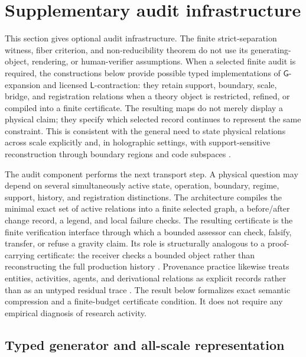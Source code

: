 \documentclass[11pt]{article}
\newcommand{\GOp}{\ensuremath{\mathsf{G}}}
\newcommand{\LOp}{\ensuremath{\mathsf{L}}}
\theoremstyle{definition}
\begin{document}
\section{Supplementary audit infrastructure}
\label{supp:architecture}

This section gives optional audit infrastructure. The finite strict-separation
witness, fiber criterion, and non-reducibility theorem do not use its
generating-object, rendering, or human-verifier assumptions. When a selected
finite audit is required, the constructions below provide possible typed
implementations of $\GOp$-expansion and licensed $\LOp$-contraction: they retain
support, boundary, scale, bridge, and registration relations when a theory object
is restricted, refined, or compiled into a finite certificate. The resulting maps do not merely display a physical claim; they
specify which selected record continues to represent the same constraint. This is
consistent with the general need to state physical relations across scale explicitly
\cite{S_Wilson1971} and, in holographic settings, with support-sensitive
reconstruction through boundary regions and code subspaces
\cite{S_AlmheiriDongHarlow2015,S_DongHarlowWall2016}.

The audit component performs the next transport step. A physical question may
depend on several simultaneously active state, operation, boundary, regime,
support, history, and registration distinctions. The architecture compiles the
minimal exact set of active relations into a finite selected graph, a before/after
change record, a legend, and local failure checks. The resulting certificate is the
finite verification interface through which a bounded assessor can check, falsify,
transfer, or refuse a gravity claim. Its role is structurally analogous to a
proof-carrying certificate: the receiver checks a bounded object rather than
reconstructing the full production history \cite{S_Necula1997}. Provenance practice
likewise treats entities, activities, agents, and derivational relations as explicit
records rather than as an untyped residual trace \cite{S_MoreauEtAl2013}. The
result below formalizes exact semantic compression and a finite-budget certificate
condition. It does not require any empirical diagnosis of research activity.

\subsection{Typed generator and all-scale representation}
\end{document}
